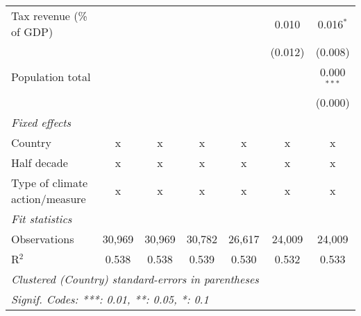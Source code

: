 \begin{tabular}{lcccccc}
   Tax revenue (\% of GDP)                      &         &               &               &               & 0.010          & 0.016$^{*}$\\   
                                                &         &               &               &               & (0.012)        & (0.008)\\   
   Population total                             &         &               &               &               &                & 0.000$^{***}$\\   
                                                &         &               &               &               &                & (0.000)\\   
   \emph{Fixed effects}\\
   Country                                      & x       & x             & x             & x             & x              & x\\  
   Half decade                                  & x       & x             & x             & x             & x              & x\\  
   Type of climate action/measure               & x       & x             & x             & x             & x              & x\\  
   \midrule \emph{Fit statistics}\\
   Observations                                 & 30,969  & 30,969        & 30,782        & 26,617        & 24,009         & 24,009\\  
   R$^2$                                        & 0.538   & 0.538         & 0.539         & 0.530         & 0.532          & 0.533\\  
   \midrule
   \multicolumn{7}{l}{\emph{Clustered (Country) standard-errors in parentheses}}\\
   \multicolumn{7}{l}{\emph{Signif. Codes: ***: 0.01, **: 0.05, *: 0.1}}\\
\end{tabular}
\par\endgroup


